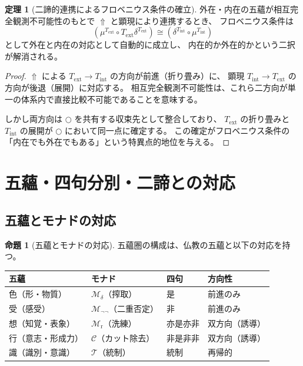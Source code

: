 \documentclass[11pt,a4paper]{article}
\theoremstyle{definition}
\newtheorem{theorem}{定理}[section]
\newtheorem{proposition}{命題}[section]
\newcommand{\Mdelta}{\mathcal{M}_{\delta}}
\newcommand{\Mneg}{\mathcal{M}_{\neg\neg}}
\newcommand{\Mr}{\mathcal{M}_{\mathrm{r}}}
\newcommand{\Mc}{\mathcal{C}}
\newcommand{\T}{\mathcal{T}}
\newcommand{\fold}{\mu}
\newcommand{\unfold}{\delta}
\newcommand{\ext}{\mathrm{ext}}
\newcommand{\intn}{\mathrm{int}}
\newcommand{\TExt}{T_{\ext}}
\newcommand{\TInt}{T_{\intn}}
\begin{document}
\begin{theorem}[二諦的連携によるフロベニウス条件の確立]
外在・内在の五蘊が相互完全観測不可能性のもとで
$\Uparrow$ と顕現により連携するとき、
フロベニウス条件は
\begin{equation}
(\fold^{\TExt} \circ \TExt\unfold^{\TExt}) 
\cong (\unfold^{\TInt} \circ \fold^{\TInt})
\end{equation}
として外在と内在の対応として自動的に成立し、
内在的か外在的かという二択が解消される。
\end{theorem}
\begin{proof}
$\Uparrow$ による $\TExt \to \TInt$ の方向が前進（折り畳み）に、
顕現 $\TInt \to \TExt$ の方向が後退（展開）に対応する。
相互完全観測不可能性は、これら二方向が単一の体系内で直接比較不可能であることを意味する。

しかし両方向は $\bigcirc$ を共有する収束先として整合しており、
$\TExt$ の折り畳みと $\TInt$ の展開が $\bigcirc$ において同一点に確定する。
この確定がフロベニウス条件の「内在でも外在でもある」という特異点的地位を与える。
\end{proof}

\section{五蘊・四句分別・二諦との対応}

\subsection{五蘊とモナドの対応}

\begin{proposition}[五蘊とモナドの対応]
五蘊圏の構成は、仏教の五蘊と以下の対応を持つ。

\begin{center}
\begin{tabular}{llll}
\hline
\textbf{五蘊} & \textbf{モナド} & \textbf{四句} & \textbf{方向性} \\
\hline
色（形・物質） & $\Mdelta$（搾取） & 是 & 前進のみ \\
受（感受） & $\Mneg$（二重否定） & 非 & 前進のみ \\
想（知覚・表象） & $\Mr$（洗練） & 亦是亦非 & 双方向（誘導） \\
行（意志・形成力） & $\Mc$（カット除去） & 非是非非 & 双方向（誘導） \\
識（識別・意識） & $\T$（統制） & 統制 & 再帰的 \\
\hline
\end{tabular}
\end{center}
\end{proposition}
\end{document}
